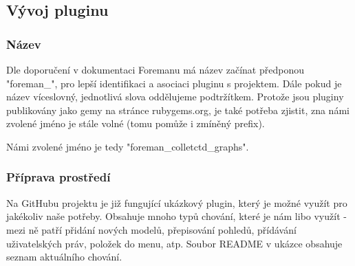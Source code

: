 \documentclass[thesis=B,czech]{FITthesis}[2012/06/26]
\begin{document}











\subsection{Vývoj pluginu}


\subsubsection{Název}
Dle doporučení v dokumentaci Foremanu má název začínat předponou "foreman\_", pro lepší identifikaci a asociaci pluginu s projektem. Dále pokud je název víceslovný, jednotlivá slova oddělujeme podtržítkem. Protože jsou pluginy publikovány jako gemy na stránce rubygems.org, je také potřeba zjistit, zna námi zvolené jméno je stále volné (tomu pomůže i zmíněný prefix).

Námi zvolené jméno je tedy "foreman\_colletctd\_graphs".

\subsubsection{Příprava prostředí}

Na GitHubu projektu je již fungující ukázkový plugin, který je možné využít pro jakékoliv naše potřeby. Obsahuje mnoho typů chování, které je nám libo využít - mezi ně patří přidání nových modelů, přepisování pohledů, přídávání uživatelských práv, položek do menu, atp. Soubor README v ukázce obsahuje seznam aktuálního chování.
\end{document}
